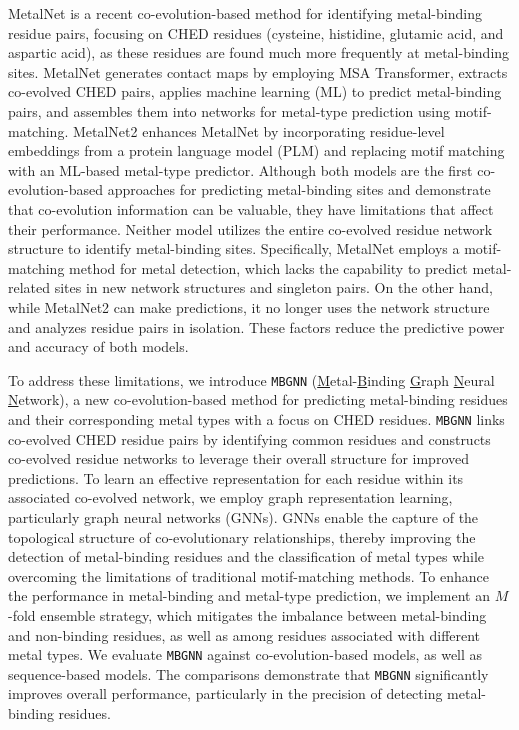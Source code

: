 \documentclass[letterpaper, 10 pt, conference]{ieeeconf}
\begin{document}
MetalNet\cite{cheng2023co} is a recent co-evolution-based method for identifying metal-binding residue pairs, focusing on CHED residues (cysteine, histidine, glutamic acid, and aspartic acid), as these residues are found much more frequently at metal-binding sites.
MetalNet generates contact maps by employing MSA Transformer\cite{pmlr-v139-rao21a}, extracts co-evolved CHED pairs, applies machine learning (ML) to predict metal-binding pairs, and assembles them into networks for metal-type prediction using motif-matching. MetalNet2 \cite{10.1093/nsr/nwae391} enhances MetalNet by incorporating residue-level embeddings from a protein language model (PLM) and replacing motif matching with an ML-based metal-type predictor. Although both models are the first co-evolution-based approaches for predicting metal-binding sites and demonstrate that co-evolution information can be valuable, they have limitations that affect their performance. Neither model utilizes the entire co-evolved residue network structure to identify metal-binding sites. Specifically, MetalNet employs a motif-matching method for metal detection, which lacks the capability to predict metal-related sites in new network structures and singleton pairs. On the other hand, while MetalNet2 can make predictions, it no longer uses the network structure and analyzes residue pairs in isolation. These factors reduce the predictive power and accuracy of both models.

To address these limitations, we introduce \texttt{MBGNN} (\underline{M}etal-\underline{B}inding \underline{G}raph \underline{N}eural \underline{N}etwork), a new co-evolution-based method for predicting metal-binding residues and their corresponding metal types with a focus on CHED residues. \texttt{MBGNN} links co-evolved CHED residue pairs by identifying common residues and constructs co-evolved residue networks to leverage their overall structure for improved predictions. To learn an effective representation for each residue within its associated co-evolved network, we employ graph representation learning, particularly graph neural networks (GNNs)\cite{khoshraftar2024survey, velivckovic2023everything, corso2024graph}. GNNs enable the capture of the topological structure of co-evolutionary relationships, thereby improving the detection of metal-binding residues and the classification of metal types while overcoming the limitations of traditional motif-matching methods. To enhance the performance in metal-binding and metal-type prediction, we implement an $M$-fold ensemble strategy, which mitigates the imbalance between metal-binding and non-binding residues, as well as among residues associated with different metal types. We evaluate \texttt{MBGNN} against co-evolution-based models, as well as sequence-based models. The comparisons demonstrate that \texttt{MBGNN} significantly improves overall performance, particularly in the precision of detecting metal-binding residues.
\end{document}
